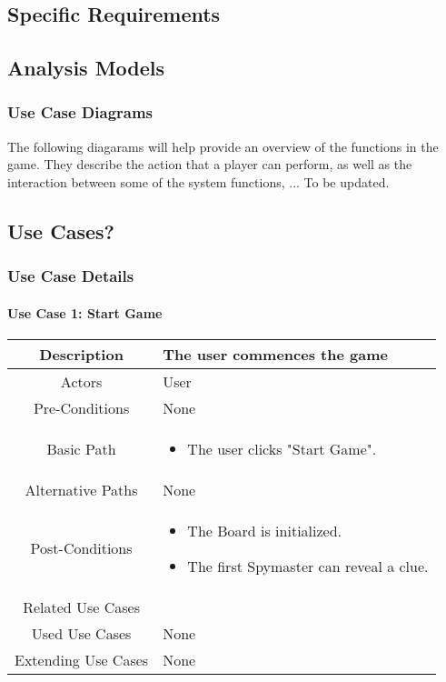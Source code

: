 \documentclass[10pt, a4paper]{article}
\begin{document}
	
	\subsection{Specific Requirements}
	
	\subsection{Analysis Models}
	
		\subsubsection{Use Case Diagrams}
		
		The following diagarams will help provide an overview of the functions in the game. They describe the action that a player can perform, as well as the interaction between some of the system functions, ... To be updated.\\
		
		\subsection{Use Cases?}
		
		\subsubsection{Use Case Details}
			\paragraph{Use Case 1: Start Game }
			
			\begin{center}
				\begin{tabular}{ |c|p{7cm}| } 
					\hline
					Description & The user commences the game  \\
					\hline 
					Actors & User \\
					\hline  
					Pre-Conditions & None \\
					\hline  
					Basic Path & 
					
					\begin{itemize}
						
						\item The user clicks "Start Game".
					\end{itemize}\\
					\hline
					Alternative Paths & None \\
					\hline
					Post-Conditions & \begin{itemize}
						\item The Board is initialized.
						\item The first Spymaster can reveal a clue. 
					\end{itemize} \\
					\hline 
					Related Use Cases & \\
					\hline 
					Used Use Cases & None \\
					\hline 
					Extending Use Cases & None \\
					\hline 
				\end{tabular}
			\end{center}
	
\end{document}
